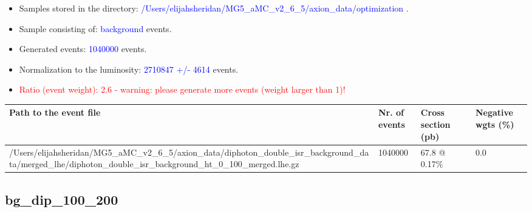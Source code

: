 \documentclass[a4paper, 10pt]{article}
\begin{document}
\begin{itemize}
  \item Samples stored in the directory: \textcolor{blue}{/\-Users/\-elijahsheridan/\-MG5\_aMC\_v2\_6\_5/\-axion\_data/\-optimization} .
   \item Sample consisting of: \textcolor{blue}{background}  events.
   \item Generated events: \textcolor{blue}{1040000 }  events.
   \item Normalization to the luminosity: \textcolor{blue}{2710847}\textcolor{blue}{ +/\-- }\textcolor{blue}{4614 }  events.
   \item\textcolor{red}{Ratio (event weight): }\textcolor{red}{2.6 }\textcolor{red}{ - warning: please generate more events (weight larger than 1)!}
\textcolor{red}{}
\end{itemize}
\begin{table}[H]
  \begin{center}
    \begin{tabular}{|m{55.0mm}|m{25.0mm}|m{30.0mm}|m{30.0mm}|}
      \hline
      {\cellcolor{yellow}         Path to the event file}& {\cellcolor{yellow}         Nr. of events}& {\cellcolor{yellow}         Cross section (pb)}& {\cellcolor{yellow}         Negative wgts (\%)}\\
      \hline
      {\cellcolor{white}          /\-Users/\-elijahsheridan/\-MG5\_aMC\_v2\_6\_5/\-axion\_data/\-diphoton\_double\_isr\_background\_data/\-merged\_lhe/\-diphoton\_double\_isr\_background\_ht\_0\_100\_merged.lhe.gz}& {\cellcolor{white}          1040000}& {\cellcolor{white}          67.8 @ 0.17\%}& {\cellcolor{white}          0.0}\\
\hline
    \end{tabular}
  \end{center}
\end{table}

\subsection{ bg\_dip\_100\_200}
\end{document}

